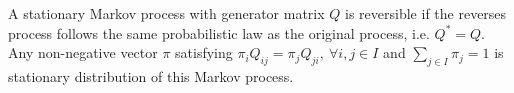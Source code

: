 \documentclass[a4paper,10pt,english]{article}
\begin{document}
\begin{lem} A stationary Markov process with generator matrix $Q$ is reversible if the reverses process follows the same probabilistic law as the original process, i.e. $Q^*= Q$. Any non-negative vector $\pi$ satisfying $\pi_iQ_{ij}=\pi_jQ_{ji},~\forall i,j \in I$ and $\sum_{j \in I}\pi_j=1$ is stationary distribution of this Markov process. 
\end{lem}
%
\end{document}
